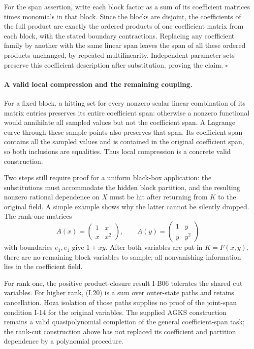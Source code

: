 \documentclass[11pt,a4paper]{article}
\theoremstyle{definition}\newtheorem{definition}{Definition}
\begin{document}
For the span assertion, write each block factor as a sum of its
coefficient matrices times monomials in that block.  Since the
blocks are disjoint, the coefficients of the full product are
exactly the ordered products of one coefficient matrix from each
block, with the stated boundary contractions.  Replacing any
coefficient family by another with the same linear span leaves
the span of all these ordered products unchanged, by repeated
multilinearity.  Independent parameter sets preserve this coefficient
description after substitution, proving the claim.
\hfill$\square$

\paragraph{A valid local compression and the remaining coupling.}
For a fixed block, a hitting set for every nonzero scalar linear
combination of its matrix entries preserves its entire coefficient
span: otherwise a nonzero functional would annihilate all sampled
values but not the coefficient span.  A Lagrange curve through
these sample points also preserves that span.  Its coefficient
span contains all the sampled values and is contained in the
original coefficient span, so both inclusions are equalities.
Thus local compression is a concrete valid construction.

Two steps still require proof for a uniform black-box application:
the substitutions must accommodate the hidden block partition, and
the resulting nonzero rational dependence on $X$ must be hit after
returning from $K$ to the original field.  A simple example shows
why the latter cannot be silently dropped.  The rank-one matrices
\[
 A(x)=\begin{pmatrix}1&x\\x&x^2\end{pmatrix},\qquad
 A(y)=\begin{pmatrix}1&y\\y&y^2\end{pmatrix}
\]
with boundaries $e_1,e_1$ give $1+xy$.  After both variables are
put in $K=F(x,y)$, there are no remaining block variables to sample;
all nonvanishing information lies in the coefficient field.

For rank one, the positive product-closure result I-B06 tolerates
the shared cut variables.  For higher rank, (I.20) is a sum over
outer-state paths and retains cancellation.  Hoza isolation of
those paths supplies no proof of the joint-span condition I-14
for the original variables.  The supplied AGKS construction remains
a valid quasipolynomial completion of the general coefficient-span
task; the rank-cut construction above has not replaced its
coefficient and partition dependence by a polynomial procedure.
\end{document}
